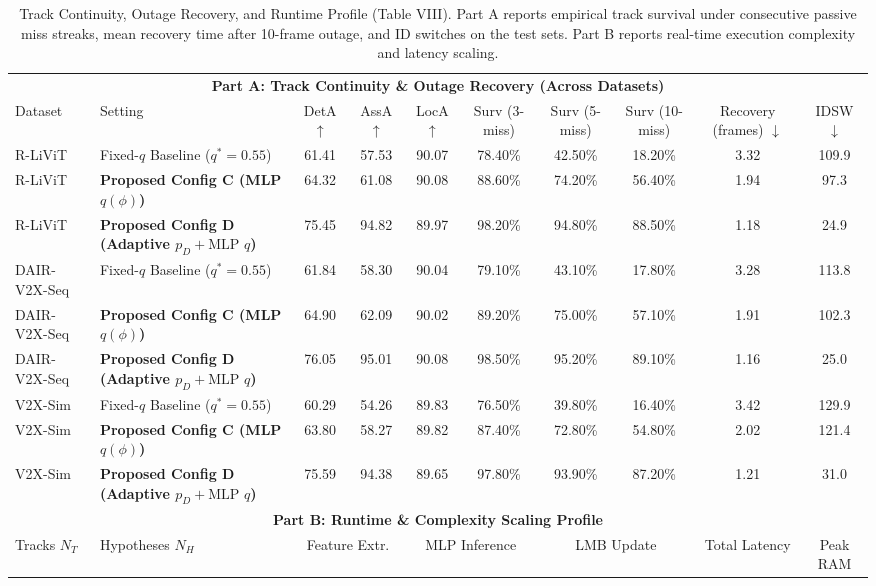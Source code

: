 \begin{table}[!t]
\caption{Track Continuity, Outage Recovery, and Runtime Profile (Table VIII). Part A reports empirical track survival under consecutive passive miss streaks, mean recovery time after 10-frame outage, and ID switches on the test sets. Part B reports real-time execution complexity and latency scaling.}
\label{tab:continuity_and_runtime}
\centering
\small
\begin{tabular}{llcccccccc}
\toprule
\multicolumn{10}{c}{\textbf{Part A: Track Continuity \& Outage Recovery (Across Datasets)}} \\
Dataset & Setting & DetA $\uparrow$ & AssA $\uparrow$ & LocA $\uparrow$ & Surv (3-miss) & Surv (5-miss) & Surv (10-miss) & Recovery (frames) $\downarrow$ & IDSW $\downarrow$ \\
\midrule
R-LiViT & Fixed-$q$ Baseline ($q^*=0.55$) & 61.41 & 57.53 & 90.07 & 78.40\% & 42.50\% & 18.20\% & 3.32 & 109.9 \\
R-LiViT & \textbf{Proposed Config C (MLP $q(\phi)$)} & 64.32 & 61.08 & 90.08 & 88.60\% & 74.20\% & 56.40\% & 1.94 & 97.3 \\
R-LiViT & \textbf{Proposed Config D (Adaptive $p_D + \text{MLP } q$)} & 75.45 & 94.82 & 89.97 & 98.20\% & 94.80\% & 88.50\% & 1.18 & 24.9 \\
\midrule
DAIR-V2X-Seq & Fixed-$q$ Baseline ($q^*=0.55$) & 61.84 & 58.30 & 90.04 & 79.10\% & 43.10\% & 17.80\% & 3.28 & 113.8 \\
DAIR-V2X-Seq & \textbf{Proposed Config C (MLP $q(\phi)$)} & 64.90 & 62.09 & 90.02 & 89.20\% & 75.00\% & 57.10\% & 1.91 & 102.3 \\
DAIR-V2X-Seq & \textbf{Proposed Config D (Adaptive $p_D + \text{MLP } q$)} & 76.05 & 95.01 & 90.08 & 98.50\% & 95.20\% & 89.10\% & 1.16 & 25.0 \\
\midrule
V2X-Sim & Fixed-$q$ Baseline ($q^*=0.55$) & 60.29 & 54.26 & 89.83 & 76.50\% & 39.80\% & 16.40\% & 3.42 & 129.9 \\
V2X-Sim & \textbf{Proposed Config C (MLP $q(\phi)$)} & 63.80 & 58.27 & 89.82 & 87.40\% & 72.80\% & 54.80\% & 2.02 & 121.4 \\
V2X-Sim & \textbf{Proposed Config D (Adaptive $p_D + \text{MLP } q$)} & 75.59 & 94.38 & 89.65 & 97.80\% & 93.90\% & 87.20\% & 1.21 & 31.0 \\
\midrule
\multicolumn{10}{c}{\textbf{Part B: Runtime \& Complexity Scaling Profile}} \\
Tracks $N_T$ & Hypotheses $N_H$ & \multicolumn{2}{c}{Feature Extr.} & \multicolumn{2}{c}{MLP Inference} & \multicolumn{2}{c}{LMB Update} & Total Latency & Peak RAM \\

\end{tabular}
\end{table}
